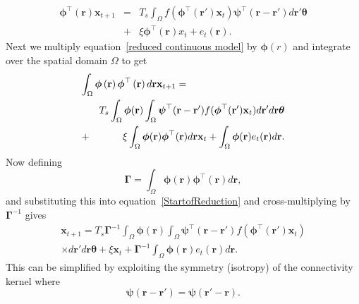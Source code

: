 \documentclass[twocolumn,11pt,a4paper]{article}		%
\begin{document}
\begin{eqnarray}
	\label{reduced continuous model}\boldsymbol{\phi}^{\top}(\mathbf{r})\mathbf{x}_{t+1}&=& T_s\int_\Omega{f(\boldsymbol{\phi}^{\top}(\mathbf{r}')\mathbf{x}_t )\boldsymbol{\psi}^{\top}(\mathbf{r}-\mathbf{r}')d\mathbf{r}'}\boldsymbol{\theta}\nonumber \\ 
	&+& \xi\boldsymbol{\phi}^{\top}(\mathbf{r})x_t + e_t(\mathbf{r}). 
\end{eqnarray}
Next we multiply equation~\ref{reduced continuous model} by $\boldsymbol{\phi}(r)$ and integrate over the spatial domain $\Omega$ to get 
\begin{eqnarray}
	\label{StartofReduction}\lefteqn{ \int_\Omega {\boldsymbol{\phi} \left(\mathbf{r}\right)\boldsymbol{\phi}^{\top}\left(\mathbf{r}\right) d\mathbf{r}} \mathbf{x}_{t+1}=} \nonumber\\
 &&T_s \int_\Omega {\boldsymbol{\phi} (\mathbf{r}) \int_\Omega {\boldsymbol{\psi}^{\top} (\mathbf{r}-\mathbf{r}') f(\boldsymbol{\phi}^{\top}(\mathbf{r}') \mathbf{x}_t ) d\mathbf{r}'}d\mathbf{r}}\boldsymbol{\theta} \nonumber\\
&+& \xi\int_\Omega {\boldsymbol{\phi}(\mathbf{r})\boldsymbol{\phi}^{\top}(\mathbf{r})d\mathbf{r}} \mathbf{x}_t+
\int_\Omega{\boldsymbol{\phi} (\mathbf{r}) e_t(\mathbf{r})d\mathbf{r}}. 
\end{eqnarray}
Now defining
\begin{equation}\label{eq:DefGamma}
	\boldsymbol{\Gamma} = \int_\Omega {\boldsymbol{\phi} \left(\mathbf{r}\right)\boldsymbol{\phi} ^{\top}\left(\mathbf{r}\right)d\mathbf{r}}, 
\end{equation}
and substituting this into equation~\ref{StartofReduction} and cross-multiplying by $\boldsymbol{\Gamma}^{-1}$ gives 
\begin{eqnarray}\label{eq:ReducedForm}
	 \mathbf{x}_{t+1} = T_s\boldsymbol{\Gamma}^{-1}\int_\Omega \boldsymbol{\phi}(\mathbf{r}) \int_\Omega \boldsymbol{\psi}^{\top} (\mathbf{r}-\mathbf{r}')f(\boldsymbol{\phi}^{\top}(\mathbf{r}')\mathbf{x}_t) \nonumber \\ 
	\times d\mathbf{r}' d\mathbf{r} \boldsymbol{\theta} + \xi\mathbf{x}_t + \boldsymbol{\Gamma}^{-1} \int_\Omega{\boldsymbol{\phi}(\mathbf{r})e_t(\mathbf{r})d\mathbf{r}}.
\end{eqnarray}
This can be simplified by exploiting the symmetry (isotropy) of the connectivity kernel where
\begin{equation}
	\boldsymbol{\psi} (\mathbf{r}-\mathbf{r}') = \boldsymbol{\psi} (\mathbf{r}'-\mathbf{r}).
\end{equation}
\end{document}
